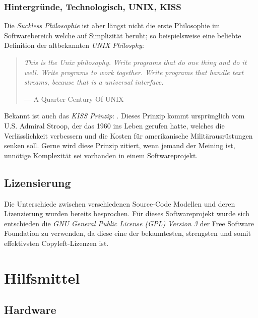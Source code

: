 \documentclass[a4paper,11pt]{article}
\newenvironment{nicequote}[2]{
    \begin{center}\begin{quote}\textit{#1}\\\par\raggedleft--- {#2}
    }{
    \end{quote}\end{center}
}
\begin{document}
\subsubsection{Hintergründe, Technologisch, UNIX, KISS}
Die \textit{Suckless Philosophie} ist aber längst nicht die erste Philosophie im Softwarebereich welche auf Simplizität beruht; so beispielsweise eine beliebte Definition der altbekannten \textit{UNIX Philosphy}:

\begin{nicequote}{This is the Unix philosophy. Write programs that do one thing and do it well. Write programs to work together. Write programs that handle text streams, because that is a universal interface.}{A Quarter Century Of UNIX \cite{salus1994}}
\end{nicequote}

Bekannt ist auch das \textit{KISS Prinzip}: . Dieses Prinzip kommt ursprünglich vom U.S. Admiral Stroop, der das  1960 ins Leben gerufen hatte, welches die Verlässlichkeit verbessern und die Kosten für amerikanische Militärausrüstungen senken soll. \cite{dalzell2009} Gerne wird diese Prinzip zitiert, wenn jemand der Meining ist, unnötige Komplexität sei vorhanden in einem Softwareprojekt.

\subsection{Lizensierung}

Die Unterschiede zwischen verschiedenen Source-Code Modellen und deren Lizenzierung wurden bereits besprochen. Für dieses Softwareprojekt wurde sich entschieden die \textit{GNU General Public License (GPL) Version 3} \cite{GPLv3} der Free Software Foundation zu verwenden, da diese eine der bekanntesten, strengsten und somit effektivsten Copyleft-Lizenzen ist.

\section{Hilfsmittel}

\subsection{Hardware}
\end{document}
